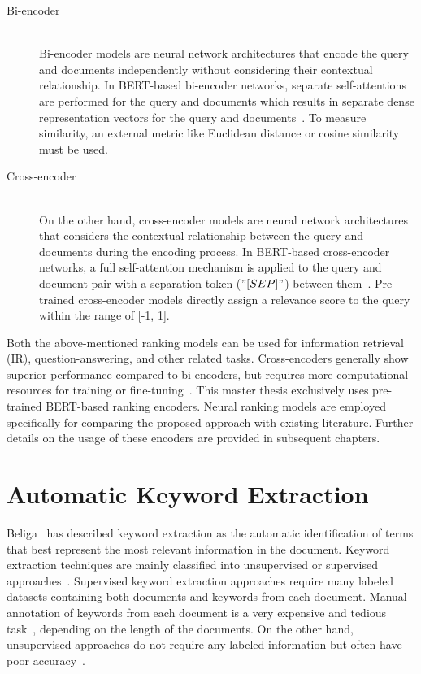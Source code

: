 \begin{description}
	\item[Bi-encoder]  \hfill \\ Bi-encoder models are neural network architectures that encode the query and documents independently without considering their contextual relationship. In BERT-based bi-encoder networks, separate self-attentions are performed for the query and documents which results in separate dense representation vectors for the query and documents~\cite{choi2021improving}. To measure similarity, an external metric like Euclidean distance or cosine similarity must be used.
	 
	\item[Cross-encoder]  \hfill \\ On the other hand, cross-encoder models are neural network architectures that considers the contextual relationship between the query and documents during the encoding process. In BERT-based cross-encoder networks, a full self-attention mechanism is applied to the query and document pair with a separation token ($"[SEP]"$) between them~\cite{choi2021improving}. Pre-trained cross-encoder models directly assign a relevance score to the query within the range of [-1, 1].
	
\end{description}

Both the above-mentioned ranking models can be used for information retrieval (IR), question-answering, and other related tasks. Cross-encoders generally show superior performance compared to bi-encoders, but requires more computational resources for training or fine-tuning~\cite{choi2021improving, jung2022semi}. This master thesis exclusively uses pre-trained BERT-based ranking encoders. Neural ranking models are employed specifically for comparing the proposed approach with existing literature. Further details on the usage of these encoders are provided in subsequent chapters.
\section{Automatic Keyword Extraction}
Beliga~\cite{beliga2014keyword} has described keyword extraction as the automatic identification of terms that best represent the most relevant information in the document. Keyword extraction techniques are mainly classified into unsupervised or supervised approaches~\cite{bennani2018simple}. Supervised keyword extraction approaches require many labeled datasets containing both documents and keywords from each document. Manual annotation of keywords from each document is a very expensive and tedious task~\cite{beliga2014keyword}, depending on the length of the documents. On the other hand, unsupervised approaches do not require any labeled information but often have poor accuracy~\cite{bennani2018simple}.


